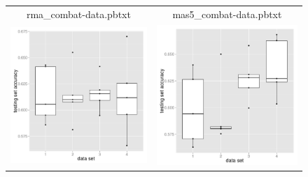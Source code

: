 \begin{figure}
\begin{centering}
\begin{tabular}{cc}
rma\_combat-data.pbtxt & mas5\_combat-data.pbtxt\tabularnewline
\includegraphics[width=0.34\paperwidth]{images/breast_cancer_08-accuracies-testing-ep_fi.pdf} & \includegraphics[width=0.34\paperwidth]{images/breast_cancer_08-accuracies-testing-fm_gf.pdf}\tabularnewline

\end{tabular}
\end{centering}
\end{figure}
